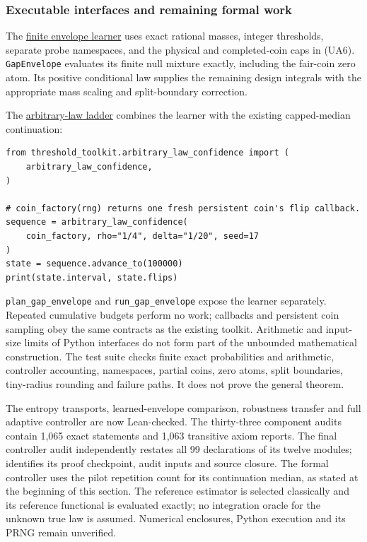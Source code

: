 \clearpage
\subsubsection{Executable interfaces and remaining formal work}

The \href{https://github.com/davidiach/adaptive-threshold-estimation/blob/9dbddf6622c17f37fb98c79bcf4407f579318a45/toolkit/threshold_toolkit/gap_envelope.py}{finite envelope learner}
uses exact rational masses, integer thresholds, separate probe namespaces,
and the physical and completed-coin caps in (UA6). \texttt{GapEnvelope} evaluates
its finite null mixture exactly, including the fair-coin zero atom. Its
positive conditional law supplies the remaining design integrals with the
appropriate mass scaling and split-boundary correction.

The \href{https://github.com/davidiach/adaptive-threshold-estimation/blob/9dbddf6622c17f37fb98c79bcf4407f579318a45/toolkit/threshold_toolkit/arbitrary_law_confidence.py}{arbitrary-law ladder}
combines the learner with the existing capped-median continuation:

\begin{verbatim}
from threshold_toolkit.arbitrary_law_confidence import (
    arbitrary_law_confidence,
)

# coin_factory(rng) returns one fresh persistent coin's flip callback.
sequence = arbitrary_law_confidence(
    coin_factory, rho="1/4", delta="1/20", seed=17
)
state = sequence.advance_to(100000)
print(state.interval, state.flips)
\end{verbatim}

\texttt{plan\_gap\_envelope} and \texttt{run\_gap\_envelope} expose the learner separately.
Repeated cumulative budgets perform no work; callbacks and persistent
coin sampling obey the same contracts as the existing toolkit. Arithmetic
and input-size limits of Python interfaces do not form part of the
unbounded mathematical construction. The test suite checks finite exact
probabilities and arithmetic, controller accounting, namespaces, partial
coins, zero atoms, split boundaries, tiny-radius rounding and failure paths.
It does not prove the general theorem.

The entropy transports, learned-envelope comparison, robustness transfer
and full adaptive controller are now Lean-checked. The thirty-three component
audits contain 1,065 exact statements and 1,063 transitive axiom reports.
The final controller audit independently restates all 99 declarations of
its twelve modules; 
identifies its proof checkpoint, audit inputs and source closure.
The formal controller uses the pilot repetition count for its continuation
median, as stated at the beginning of this section. The reference estimator
is selected classically and its reference functional is evaluated exactly;
no integration oracle for the unknown true law is assumed. Numerical
enclosures, Python execution and its PRNG remain unverified.
